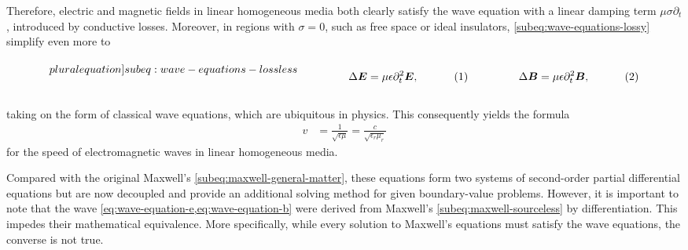\documentclass[11pt,a4paper,twoside,openany]{report}
\begin{document}
Therefore, electric and magnetic fields in linear homogeneous media both clearly satisfy the wave equation with a linear damping term $\mu\sigma\partial_t$, introduced by conductive losses. Moreover, in regions with $\sigma = 0$, such as free space or ideal insulators, \cref{subeq:wave-equations-lossy} simplify even more to\\
\begin{subequations}
    \label[pluralequation]{subeq:wave-equations-lossless}
    \noindent\centering
    \begin{minipage}{0.45\textwidth}
        \begin{align}
            \label{eq:wave-equation-e-lossless}
            \Delta\vec E &= \mu\epsilon\partial^2_t\vec E,
        \end{align}
    \end{minipage}
    \hfill
    \begin{minipage}{0.45\textwidth}
        \begin{align}
            \label{eq:wave-equations-b-lossless}
            \Delta\vec B &= \mu\epsilon\partial^2_t\vec B,
        \end{align}
    \end{minipage}\bigskip
\end{subequations}\\
taking on the form of classical wave equations, which are ubiquitous in physics. This consequently yields the formula
\begin{align}
    v &= \frac{1}{\sqrt{\epsilon\mu}} = \frac{c}{\sqrt{\epsilon_r\mu_r}}
\end{align}
for the speed of electromagnetic waves in linear homogeneous media.

\begin{remark}
    \label{remark:nonequivalence-of-wave-equations-with-maxwells-equations}
    Compared with the original Maxwell's \cref{subeq:maxwell-general-matter}, these equations form two systems of second-order partial differential equations but are now decoupled and provide an additional solving method for given boundary-value problems. However, it is important to note that the wave \cref{eq:wave-equation-e,eq:wave-equation-b} were derived from Maxwell's \cref{subeq:maxwell-sourceless} by differentiation. This impedes their mathematical equivalence. More specifically, while every solution to Maxwell's equations must satisfy the wave equations, the converse is not true.
\end{remark}
\end{document}
